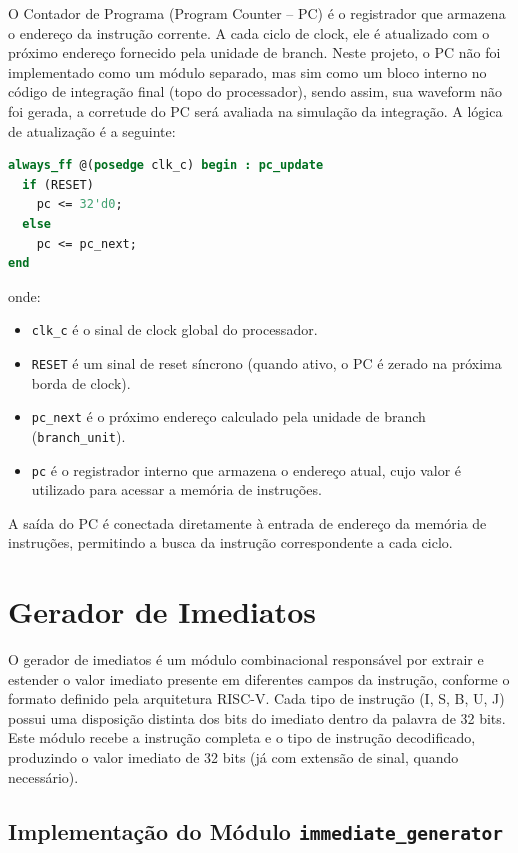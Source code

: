 \documentclass[
	12pt,				%
	oneside,
	a4paper,			%
	english,			%
	french,				%
	spanish,			%
	brazil,				%
	]{abntex2}
\begin{document}
O Contador de Programa (Program Counter – PC) é o registrador que armazena o endereço da instrução corrente. A cada ciclo de clock, ele é atualizado com o próximo endereço fornecido pela unidade de branch. Neste projeto, o PC não foi implementado como um módulo separado, mas sim como um bloco interno no código de integração final (topo do processador), sendo assim, sua waveform não foi gerada, a corretude do PC será avaliada na simulação da integração. A lógica de atualização é a seguinte:

\begin{lstlisting}[language=SystemVerilog, caption={Lógica do PC (dentro do módulo topo)}, label={lst:pc_code}]
always_ff @(posedge clk_c) begin : pc_update
  if (RESET)
    pc <= 32'd0;
  else
    pc <= pc_next;
end
\end{lstlisting}

\noindent onde:
\begin{itemize}
  \item \texttt{clk\_c} é o sinal de clock global do processador.
  \item \texttt{RESET} é um sinal de reset síncrono (quando ativo, o PC é zerado na próxima borda de clock).
  \item \texttt{pc\_next} é o próximo endereço calculado pela unidade de branch (\texttt{branch\_unit}).
  \item \texttt{pc} é o registrador interno que armazena o endereço atual, cujo valor é utilizado para acessar a memória de instruções.
\end{itemize}

A saída do PC é conectada diretamente à entrada de endereço da memória de instruções, permitindo a busca da instrução correspondente a cada ciclo.

\section{Gerador de Imediatos}

O gerador de imediatos é um módulo combinacional responsável por extrair e estender o valor imediato presente em diferentes campos da instrução, conforme o formato definido pela arquitetura RISC-V. Cada tipo de instrução (I, S, B, U, J) possui uma disposição distinta dos bits do imediato dentro da palavra de 32 bits. Este módulo recebe a instrução completa e o tipo de instrução decodificado, produzindo o valor imediato de 32 bits (já com extensão de sinal, quando necessário).

\subsection{Implementação do Módulo \texttt{immediate\_generator}}
\end{document}
